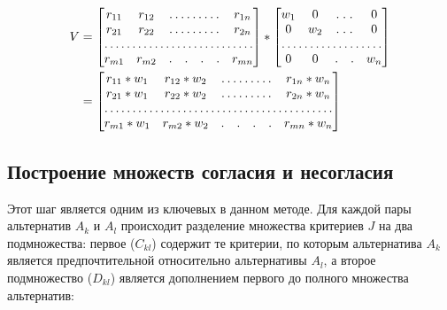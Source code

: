 \documentclass{article}
\begin{document}
        \begin{equation}
        \label{eq:weighted_norm_decision_matrix}
            \begin{alignedat}{2}
                V &= \begin{bmatrix}
                    r_{11}&  r_{12}& \hdotsfor{4} & r_{1n}\\
                    r_{21}&  r_{22}& \hdotsfor{4} & r_{2n}\\
                    \hdotsfor{7}\\
                    r_{m1}&  r_{m2}& . & . & . & . & r_{mn}\\
                \end{bmatrix} * \begin{bmatrix}
                    w_{1}&  0 & \hdotsfor{2} & 0\\
                    0 &  w_{2}& \hdotsfor{2} & 0\\
                    \hdotsfor{5}\\
                    0 &  0 & . & . & w_{n}\\
                \end{bmatrix} \\
                &= \begin{bmatrix}
                    r_{11}*w_{1}&  r_{12} * w_{2}& \hdotsfor{4} & r_{1n}*w_{n}\\
                    r_{21}*w_{1}&  r_{22} * w_{2}& \hdotsfor{4} & r_{2n}*w_{n}\\
                    \hdotsfor{7}\\
                    r_{m1}*w_{1}&  r_{m2} * w_{2}& . & . & . & . & r_{mn}*w_{n}\\
                \end{bmatrix}
                \end{alignedat}
        \end{equation}

    \subsection{Построение множеств согласия и несогласия}
        Этот шаг является одним из ключевых в данном методе. Для каждой пары альтернатив
        \(A_k\) и \(A_l\) происходит разделение множества критериев \(J\) на два подмножества:
        первое (\(C_{kl}\)) содержит те критерии, по которым альтернатива \(A_k\) является
        предпочтительной относительно альтернативы \(A_l\), а второе подмножество (\(D_{kl}\))
        является дополнением первого до полного множества альтернатив:
\end{document}
